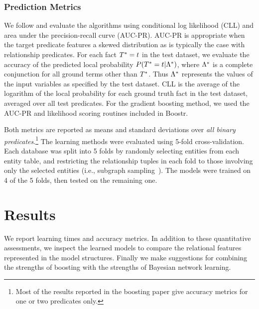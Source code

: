 \documentclass[runningheads,a4paper]{llncs}
\begin{document}
\subsubsection{Prediction Metrics}
We follow \cite{Khot2011} and evaluate the algorithms using conditional log likelihood (CLL) and area under the precision-recall curve (AUC-PR). AUC-PR is appropriate when the target predicate features a skewed distribution as is typically the case with relationship predicates. %
For each fact $T^{*}\hspace{0.0ex} = t$ in the test dataset, we evaluate the accuracy of the predicted local probability $P(T^{*}\hspace{0.0ex} = t | \Lambda^{*}\hspace{0.0ex})$, where $\Lambda^{*}\hspace{0.0ex}$ is a complete conjunction for all ground terms other than $T^{*}\hspace{0.0ex}$. Thus $\Lambda^{*}\hspace{0.0ex}$ represents the values of the input variables as specified by the test dataset.
CLL is the average of the logarithm of the local probability for each ground truth fact in the test dataset, averaged over all test predicates. For the gradient boosting method, we used the AUC-PR and likelihood scoring routines included in Boostr.


Both metrics are reported as means and standard deviations over {\em all binary predicates}.\footnote{Most of the results reported in the boosting paper \cite{Khot2011} give accuracy metrics for one or two predicates only.}
The learning methods were evaluated using 5-fold cross-validation. Each database was split into 5 folds by randomly selecting entities from each entity table, and restricting the relationship tuples in each fold to those involving only the selected entities  (i.e., subgraph sampling~\cite{Schulte2012}). The models were trained on 4 of the 5 folds, then tested on the remaining one. 

\section{Results} 
%


We report learning times and accuracy metrics. In addition to these quantitative assessments, we inspect the learned models to compare the relational features represented in the model structures. Finally we make suggestions for combining the strengths of boosting with the strengths of Bayesian network learning. 
\end{document}

